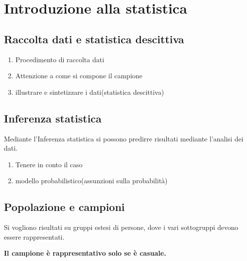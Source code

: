 
\chapter{Introduzione alla statistica}


\section{Raccolta dati e statistica descittiva}
\begin{enumerate}
  \item Procedimento di raccolta dati
  \item Attenzione a come si compone il campione
  \item illustrare e sintetizzare i dati(statistica descittiva)
\end{enumerate}


\section{Inferenza statistica}
Mediante l'Inferenza statistica si possono predirre risultati mediante l'analisi dei dati.

\begin{enumerate}
  \item Tenere in conto il caso
  \item modello probabilistico(assunzioni sulla probabilit\`{a})
\end{enumerate}


\section{Popolazione e campioni}

Si vogliono risultati su gruppi estesi di persone, dove i vari sottogruppi devono essere 
rappresentati.

\textbf{Il campione \`{e} rappresentativo solo se \`{e} casuale.}

